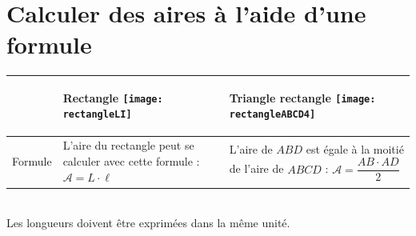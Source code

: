 
\newpage

\vspace{2em}
\section{Calculer des aires à l'aide d'une formule}

\begin{aconnaitre}
\begin{tabularx}{\linewidth}{|c|X|X|}
 \cline{2-3}
\multicolumn{1}{c|}{} & \begin{center} \textbf{\textcolor{H1}{Rectangle}} \texttt{[image: rectangleLI]} \end{center} & \begin{center} \textbf{\textcolor{H1}{Triangle rectangle}} \texttt{[image: rectangleABCD4]} \end{center} \\ \hline
Formule & L'aire du rectangle peut se calculer avec cette formule : {\large \textbf{$\mathcal{A} = L \cdot \ell$}} & L'aire de $ABD$ est égale à la moitié de l'aire de $ABCD$ : {\large \textbf{$\mathcal{A} = \dfrac{AB \cdot AD}{2}$}} \phantom{retourligne} \\\hline
 \end{tabularx} \\[1em]
Les longueurs doivent être exprimées dans la même unité.
\end{aconnaitre}
